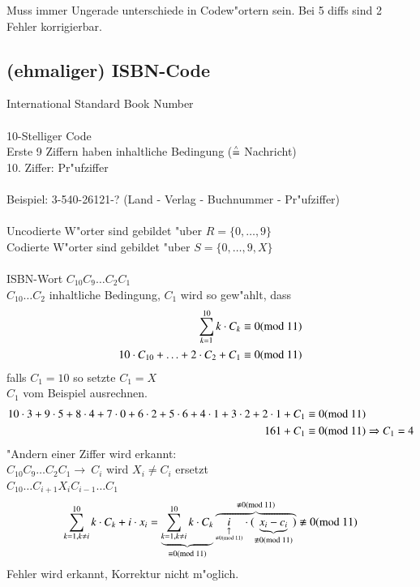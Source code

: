 Muss immer Ungerade unterschiede in Codew"ortern sein. Bei 5 diffs sind 2 Fehler korrigierbar.

\subsection{(ehmaliger) ISBN-Code}
International Standard Book Number\\
\\
10-Stelliger Code\\
Erste 9 Ziffern haben inhaltliche Bedingung ($\stackrel{\scriptscriptstyle\wedge}{=}$ Nachricht)\\
10. Ziffer: Pr"ufziffer\\
\\
Beispiel: 3-540-26121-? (Land - Verlag - Buchnummer - Pr"ufziffer)\\
\\
Uncodierte W"orter sind gebildet "uber $R=\{0, \ldots, 9\}$\\
Codierte W"orter sind gebildet "uber $S=\{0, \ldots, 9, X\}$\\
\\
ISBN-Wort $C_{10}C_9\ldots C_2C_1$\\
$C_{10}\ldots C_2$ inhaltliche Bedingung, $C_1$ wird so gew"ahlt, dass
\begin{align*}
	\sum^{10}_{k=1} k \cdot C_k &\equiv 0 (\text{mod }11)\\
	10\cdot C_{10}+\ldots + 2\cdot C_2 + C_1 &\equiv 0(\text{mod }11)
\end{align*}
falls $C_1 = 10$ so setzte $C_1 = X$\\
$C_1$ vom Beispiel ausrechnen.
\begin{align*}
	10\cdot 3+9\cdot 5+8\cdot 4+7\cdot 0+6\cdot 2+5\cdot 6+4\cdot 1+3\cdot 2+2\cdot 1+C_1 &\equiv 0 (\text{mod }11)\\
	161 + C_1 &\equiv 0 (\text{mod }11) \Rightarrow C_1 = 4
\end{align*}
"Andern einer Ziffer wird erkannt:\\
$C_{10} C_9\ldots C_2 C_1 \rightarrow\ C_i$ wird $X_i \neq C_i$ ersetzt\\
$C_{10} \ldots C_{i+1} X_i C_{i-1} \ldots C_1$
\[
	\sum^{10}_{k=1, k \neq i} k \cdot C_k + i \cdot x_i = 
	\underbrace{\sum^{10}_{k=1, k \neq i} k \cdot C_k}_{\equiv 0 (\md{11})}
	\overbrace{
			\underset{\underset{\nequiv 0 (\md{11})}{\uparrow}}{i} 
			\cdot (\underbrace{x_i-c_i}_{\nequiv 0 (\md{11})}) 
	}^{\nequiv 0 (\md{11})}
	\nequiv 0(\md{11})	
\]
Fehler wird erkannt, Korrektur nicht m"oglich.\\
\\
